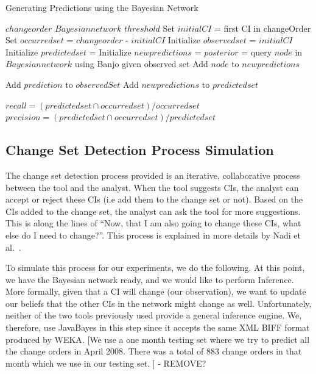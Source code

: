 \documentclass[10pt,twocolumn,letterpaper]{article}
\begin{document}
\begin{algorithm}[tb]
   \caption{Generating Predictions using the Bayesian Network}
   \label{alg:simulation}
\begin{algorithmic}
    $change order$
     $Bayesian network$
     $threshold$
    \STATE Set $initial CI$ = first CI in changeOrder
    \STATE Set $occurred set$ = $change order$ - $initial CI$
    \STATE Initialize $observed set$ = {$initial CI$}
    \STATE Initialize $predicted set$ = {}
   \REPEAT  
    \STATE Initialize $new predictions$ = {}
    \STATE $posterior$ = query $node$ in $Bayesian network$ using Banjo given observed set
      \STATE Add $node$ to $new predictions$   
    \ENDIF
    \ENDFOR

      \STATE Add $prediction$ to $observedSet$
    \ENDIF
    \ENDFOR
\STATE Add $new predictions$ to $predicted set$

\STATE $recall = (predicted set \cap occurred set)/occurred set$
\STATE $precision = (predicted set \cap occurred set)/predicted set$
\end{algorithmic}
\end{algorithm}

\subsection{Change Set Detection Process Simulation}

The change set detection process provided is an iterative, collaborative process between the tool and the analyst. When the tool suggests CIs, the analyst can
accept or reject these CIs (i.e add them to the change set or not). Based on the CIs added to the change set, the analyst can ask the tool for more
suggestions. This is along the lines of ``Now, that I am also going to change these CIs, what else do I need to change?''. This process is explained in more
details by Nadi et al.~\cite{nadi2010}.

To simulate this process for our experiments, we do the following. At this point, we have the Bayesian network ready, and we would like to perform Inference.
More formally, given that a CI will change (our observation), we want to update our beliefs that the other CIs in the network might change as well.
Unfortunately, neither of the two tools previously used provide a general inference engine. We, therefore, use JavaBayes in this step since it accepts
the same XML BIFF format produced by WEKA. [We use a one month testing set where we try to predict all the change orders in April 2008. There was a total of
883 change orders in that month which we use in our testing set. ] - REMOVE?
\end{document}
